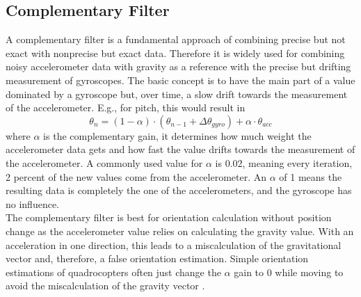 \documentclass[letterpaper, 10 pt, conference]{ieeeconf}  %
\begin{document}
\subsection{Complementary Filter}
A complementary filter is a fundamental approach of combining precise but not exact with nonprecise but exact data.
Therefore it is widely used for combining noisy accelerometer data with gravity as a reference with the precise but drifting measurement of gyroscopes.
The basic concept is to have the main part of a value dominated by a gyroscope but, over time, a slow drift towards the measurement of the accelerometer.
E.g., for pitch, this would result in 
\begin{equation}
\theta_n = (1-\alpha) \cdot (\theta_{n-1}+ \Delta\theta_{gyro})+ \alpha \cdot \theta_{acc}
\end{equation}
where $\alpha$ is the complementary gain, it determines how much weight the accelerometer data gets and how fast the value drifts towards the measurement of the accelerometer.
A commonly used value for $\alpha$ is 0.02, meaning every iteration, 2 percent of the new values come from the accelerometer.
An $\alpha$ of 1 means the resulting data is completely the one of the accelerometers, and the gyroscope has no influence. \\
The complementary filter is best for orientation calculation without position change as the accelerometer value relies on calculating the gravity value.
With an acceleration in one direction, this leads to a miscalculation of the gravitational vector and, therefore, a false orientation estimation.
Simple orientation estimations of quadrocopters often just change the $\alpha$ gain to 0 while moving to avoid the miscalculation of the gravity vector \cite{mahony2005complementary}.
\end{document}
